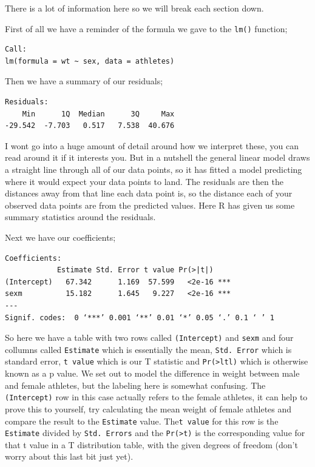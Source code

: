 \documentclass[
]{book}
\begin{document}
There is a lot of information here so we will break each section down.

First of all we have a reminder of the formula we gave to the \texttt{lm()} function;

\begin{verbatim}
Call:
lm(formula = wt ~ sex, data = athletes)
\end{verbatim}

Then we have a summary of our residuals;

\begin{verbatim}
Residuals:
    Min      1Q  Median      3Q     Max 
-29.542  -7.703   0.517   7.538  40.676 
\end{verbatim}

I wont go into a huge amount of detail around how we interpret these, you can read around it if it interests you. But in a nutshell the general linear model draws a straight line through all of our data points, so it has fitted a model predicting where it would expect your data points to land. The residuals are then the distances away from that line each data point is, so the distance each of your observed data points are
from the predicted values. Here R has given us some summary statistics around the residuals.

Next we have our coefficients;

\begin{verbatim}
Coefficients:
            Estimate Std. Error t value Pr(>|t|)    
(Intercept)   67.342      1.169  57.599   <2e-16 ***
sexm          15.182      1.645   9.227   <2e-16 ***
---
Signif. codes:  0 ‘***’ 0.001 ‘**’ 0.01 ‘*’ 0.05 ‘.’ 0.1 ‘ ’ 1
\end{verbatim}

So here we have a table with two rows called \texttt{(Intercept)} and \texttt{sexm} and four collumns called \texttt{Estimate} which is essentially the mean, \texttt{Std.\ Error} which is standard error, \texttt{t\ value} which is our T statistic and \texttt{Pr(\textgreater{}ltl)} which is otherwise known as a p value. We set out to model the difference in weight between male and female athletes, but the labeling here is somewhat confusing. The \texttt{(Intercept)} row in this case actually refers to the female athletes, it can help to prove this to yourself, try calculating the mean weight of female athletes and compare the result to the \texttt{Estimate} value. The\texttt{t\ value} for this row is the \texttt{Estimate} divided by \texttt{Std.\ Errors} and the \texttt{Pr(\textgreater{}\textbar{}t\textbar{})} is the corresponding value for that t value in a T distribution table, with the given degrees of freedom (don't worry about this last bit just yet).
\end{document}
